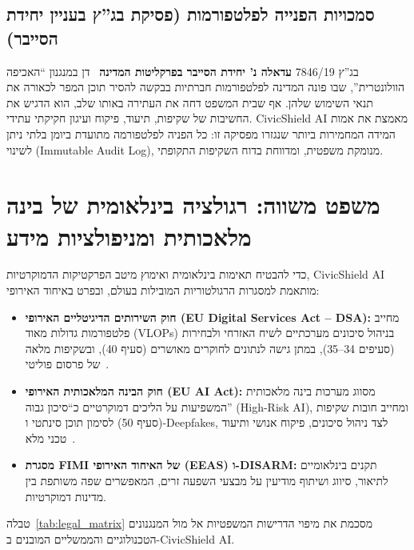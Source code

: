\subsection{סמכויות הפנייה לפלטפורמות (פסיקת בג''ץ בעניין יחידת הסייבר)}

בג''ץ 7846/19 \textbf{עדאלה נ' יחידת הסייבר בפרקליטות המדינה}~\cite{adalah2021cyber} דן במנגנון ``האכיפה הוולונטרית'', שבו פונה המדינה לפלטפורמות חברתיות בבקשה להסיר תוכן המפר לכאורה את תנאי השימוש שלהן. אף שבית המשפט דחה את העתירה באותו שלב, הוא הדגיש את החשיבות של שקיפות, תיעוד, פיקוח ועיגון חקיקתי עתידי. \textenglish{CivicShield AI} מאמצת את אמות המידה המחמירות ביותר שנגזרו מפסיקה זו: כל הפניה לפלטפורמה מתועדת ביומן בלתי ניתן לשינוי (\textenglish{Immutable Audit Log}), מנומקת משפטית, ומדווחת בדוח השקיפות התקופתי.

\section{משפט משווה: רגולציה בינלאומית של בינה מלאכותית ומניפולציות מידע}
\label{sec:comparative_law}

כדי להבטיח תאימות בינלאומית ואימוץ מיטב הפרקטיקות הדמוקרטיות, \textenglish{CivicShield AI} מותאמת למסגרות הרגולטוריות המובילות בעולם, ובפרט באיחוד האירופי:

\begin{itemize}
    \item \textbf{חוק השירותים הדיגיטליים האירופי (\textenglish{EU Digital Services Act -- DSA}):} מחייב פלטפורמות גדולות מאוד (\textenglish{VLOPs}) בניהול סיכונים מערכתיים לשיח האזרחי ולבחירות (סעיפים 34--35), במתן גישה לנתונים לחוקרים מאושרים (סעיף 40), ובשקיפות מלאה של פרסום פוליטי~\cite{eu_dsa2022}.
    \item \textbf{חוק הבינה המלאכותית האירופי (\textenglish{EU AI Act}):} מסווג מערכות בינה מלאכותית המשפיעות על הליכים דמוקרטיים כ``סיכון גבוה'' (\textenglish{High-Risk AI}), ומחייב חובות שקיפות (סעיף 50) לסימון תוכן סינתטי ו-\textenglish{Deepfakes}, לצד ניהול סיכונים, פיקוח אנושי ותיעוד טכני מלא~\cite{eu_aiact2024}.
    \item \textbf{מסגרת \textenglish{FIMI} של האיחוד האירופי (\textenglish{EEAS}) ו-\textenglish{DISARM}:} תקנים בינלאומיים לתיאור, סיווג ושיתוף מודיעין על מבצעי השפעה זרים, המאפשרים שפה משותפת בין מדינות דמוקרטיות.
\end{itemize}

טבלה~\ref{tab:legal_matrix} מסכמת את מיפוי הדרישות המשפטיות אל מול המנגנונים הטכנולוגיים והממשליים המובנים ב-\textenglish{CivicShield AI}.

